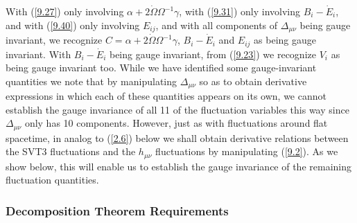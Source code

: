 With (\ref{9.27}) only involving $\alpha +2\dot{\Omega}\Omega^{-1}\gamma$, with (\ref{9.31}) only involving 
$B_i-\dot{E}_i$, and with (\ref{9.40}) only involving $E_{ij}$, and with all components of $\Delta_{\mu\nu}$ being gauge invariant, we recognize $C=\alpha +2\dot{\Omega}\Omega^{-1}\gamma$, $B_i-\dot{E}_i$ and $E_{ij}$ as being gauge invariant. With $B_i-\dot{E}_i$ being gauge invariant, from (\ref{9.23}) we recognize $V_i$ as being gauge invariant too. While we have identified some gauge-invariant quantities we note that by manipulating $\Delta_{\mu\nu}$ so as to obtain derivative expressions in which each of these quantities appears on its own, we cannot establish the gauge invariance of all 11 of the fluctuation variables this way since $\Delta_{\mu\nu}$ only has 10 components. However, just as with fluctuations around flat spacetime, in analog to (\ref{2.6}) below we shall obtain derivative relations between the SVT3 fluctuations and the $h_{\mu\nu}$ fluctuations by manipulating  (\ref{9.2}). As we show below, this will enable us  to establish the gauge invariance of the remaining fluctuation quantities.

\subsubsection{Decomposition Theorem Requirements}
\label{sss:what_is_needed_decomposition_theorem_svt3}

